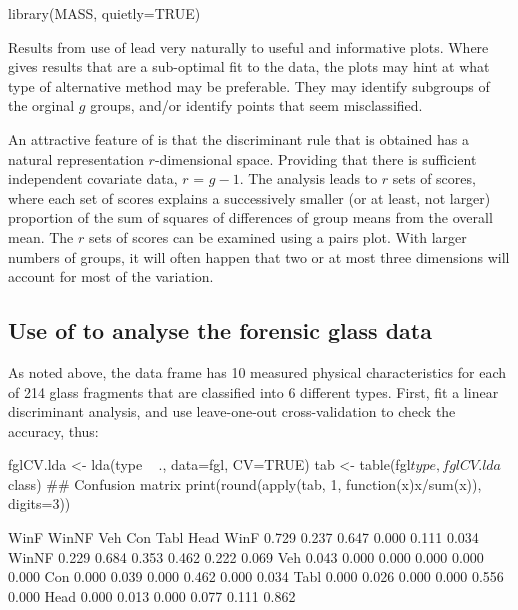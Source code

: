 \begin{Schunk}
\begin{Sinput}
library(MASS, quietly=TRUE)
\end{Sinput}
\end{Schunk}

Results from use of  lead very
  naturally to useful and informative plots.  Where 
  gives results that are a sub-optimal fit to the data,
  the plots may hint at what type of alternative method
  may be preferable.  They may identify subgroups of
  the orginal $g$ groups, and/or identify points that seem
  misclassified.   

An attractive feature of  is that the discriminant rule
that is obtained has a natural representation $r$-dimensional space.
Providing that there is sufficient independent covariate data, $r$ =
$g-1$.  The analysis leads  to $r$ sets of scores, where
each set of scores explains a successively smaller (or at least, not
larger) proportion of the sum of squares of differences of group means
from the overall mean.
The $r$ sets of scores can be examined using a
pairs plot.  With larger numbers of groups, it will often happen that
two or at most three dimensions will account for most of the
variation.

\subsection*{Use of  to analyse the forensic glass data}

As noted above, the data frame  has 10 measured physical
characteristics for each of 214 glass fragments that are classified
into 6 different types.  First, fit a linear discriminant analysis,
and use leave-one-out cross-validation to check the accuracy, thus:
\begin{Schunk}
\begin{Sinput}
fglCV.lda <- lda(type ~ ., data=fgl, CV=TRUE)
tab <- table(fgl$type, fglCV.lda$class)
## Confusion matrix
print(round(apply(tab, 1, function(x)x/sum(x)),
            digits=3))
\end{Sinput}
\begin{Soutput}
       
         WinF WinNF   Veh   Con  Tabl  Head
  WinF  0.729 0.237 0.647 0.000 0.111 0.034
  WinNF 0.229 0.684 0.353 0.462 0.222 0.069
  Veh   0.043 0.000 0.000 0.000 0.000 0.000
  Con   0.000 0.039 0.000 0.462 0.000 0.034
  Tabl  0.000 0.026 0.000 0.000 0.556 0.000
  Head  0.000 0.013 0.000 0.077 0.111 0.862
\end{Soutput}
\end{Schunk}

